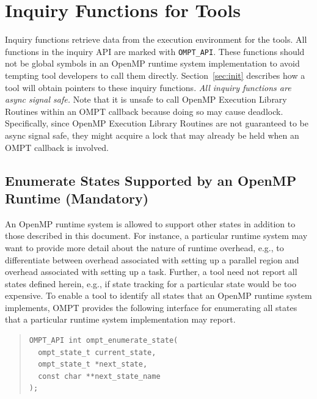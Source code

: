 \documentclass{article}
\begin{document}
 
 

\section{Inquiry Functions for Tools}
\label{sec:inquiry}

 Inquiry functions retrieve data from the execution environment for
 the tools. 
 All functions in the inquiry API are marked with \verb|OMPT_API|. These functions should not be global symbols in an OpenMP runtime system implementation to avoid tempting tool developers to call them directly. Section~\ref{sec:init} describes how a tool will obtain pointers to these inquiry functions.
 {\em All inquiry functions are async signal safe.} 
 Note that it is unsafe to call OpenMP Execution Library Routines within an OMPT callback because doing so may cause deadlock. 
 Specifically, since OpenMP Execution Library Routines are not guaranteed to be async signal safe, they might acquire a lock that may already be held when an OMPT callback is involved.
 
 \subsection{Enumerate States Supported by an OpenMP Runtime (Mandatory)}
 \label{ompt_enumerate_state}
 
 An OpenMP runtime system is allowed to support other states in addition to those described in this document.
For instance, a particular runtime system may want to 
provide more detail about the nature of runtime overhead, 
e.g., to differentiate between  overhead associated with setting up a parallel region
and  overhead associated with setting up a task. Further, a tool need not report all states defined herein, e.g., if state tracking for a particular state would be too expensive.
To enable a tool to identify all states that an OpenMP runtime system implements, OMPT provides
the following interface for enumerating all states that a particular runtime system implementation may report.

\begin{quote}
\begin{verbatim}
OMPT_API int ompt_enumerate_state(
  ompt_state_t current_state, 
  ompt_state_t *next_state, 
  const char **next_state_name
);
\end{verbatim}
\end{quote}
\end{document}
